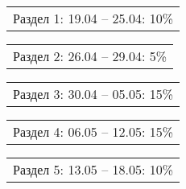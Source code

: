 \documentclass[12pt, А4, twoside]{article}
\begin{document}
\begin{FlushLeft}
    \vspace{-0.1 cm}

    \begin{tabular}{p{17.25cm}}
        \hspace{0.3cm} \textsf{Раздел 1:} \hspace{2.54cm} \textsf{ 19.04 {--} 25.04:} \hspace{0.5cm} \textsf{10\%} \vspace{0pt} \hline \\
    \end{tabular}

    \vspace{-0.1 cm}

    \begin{tabular}{p{17.25cm}}
        \hspace{0.3cm} \textsf{Раздел 2:} \hspace{2.54cm} \textsf{ 26.04 {--} 29.04:} \hspace{0.5cm} \textsf{5\%} \vspace{0pt} \hline \\
    \end{tabular}

    \vspace{-0.1 cm}

    \begin{tabular}{p{17.25cm}}
        \hspace{0.3cm} \textsf{Раздел 3:} \hspace{2.54cm} \textsf{ 30.04 {--} 05.05:} \hspace{0.5cm} \textsf{15\%} \vspace{0pt} \hline \\
    \end{tabular}

    \vspace{-0.1 cm}

    \begin{tabular}{p{17.25cm}}
        \hspace{0.3cm} \textsf{Раздел 4:} \hspace{2.54cm} \textsf{ 06.05 {--} 12.05:} \hspace{0.5cm} \textsf{15\%} \vspace{0pt} \hline \\
    \end{tabular}

    \vspace{-0.1 cm}

    \begin{tabular}{p{17.25cm}}
        \hspace{0.3cm} \textsf{Раздел 5:} \hspace{2.54cm} \textsf{ 13.05 {--} 18.05:} \hspace{0.5cm} \textsf{10\%} \vspace{0pt} \hline \\
    \end{tabular}


\end{FlushLeft}
\end{document}
